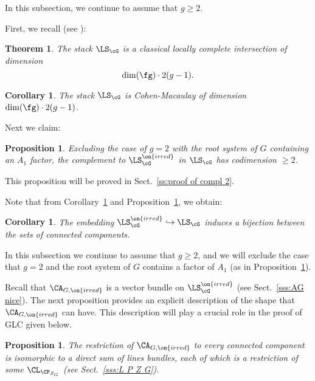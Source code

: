 \documentclass[9pt]{amsart}
\newtheorem{cor}[subsubsection]{Corollary}
\newtheorem{prop}[subsubsection]{Proposition}
\newtheorem{thm}[subsubsection]{Theorem}
\theoremstyle{remark}
\theoremstyle{definition}
\theoremstyle{remark}
\newcommand{\secref}[1]{Sect.~\ref{#1}}
\newcommand{\propref}[1]{Proposition~\ref{#1}}
\newcommand{\corref}[1]{Corollary~\ref{#1}}
\numberwithin{equation}{section}
\begin{document}
In this subsection, we continue to assume that $g\geq 2$. 

\sssec{}

First, we recall (see \cite[Proposition 2.11.2]{BD}):

\begin{thm} \label{t:LS CM}
The stack $\LS_\cG$ is a classical locally complete intersection of dimension 
$$\dim(\fg)\cdot 2(g-1).$$
\end{thm} 

\begin{cor}  \label{c:LS CM}
The stack $\LS_\cG$ is Cohen-Macaulay of dimension $\dim(\fg)\cdot 2(g-1)$.
\end{cor} 

\sssec{}

Next we claim:

\begin{prop} \label{p:compl 2}
Excluding the case of $g=2$ with the root system of $G$ containing an $A_1$ factor, 
the complement to $\LS_\cG^{\on{irred}}$ in $\LS_\cG$ has codimension $\geq 2$.
\end{prop}

This proposition will be proved in \secref{ss:proof of compl 2}.

\sssec{}

Note that from \corref{c:LS CM} and \propref{p:compl 2}, we obtain:

\begin{cor} \label{c:compl 2} 
The embedding $\LS^{\on{irred}}_\cG\hookrightarrow \LS_\cG$
induces a bijection between the sets of connected components.
\end{cor} 

 \label{ss:A G irred}

In this subsection we continue to assume that $g\geq 2$, and we will exclude the case that $g=2$ and the root system of 
$G$ contains a factor of $A_1$ (as in \propref{p:compl 2}). 

\sssec{}

Recall that $\CA_{G,\on{irred}}$ is a vector bundle on $\LS_\cG^{\on{irred}}$ (see \secref{sss:AG nice}). 
The next proposition provides an explicit description of the shape that $\CA_{G,\on{irred}}$ can have. This
description will play a crucial role in the proof of GLC given below. 

\begin{prop} \label{p:A irred}
The restriction of $\CA_{G,\on{irred}}$ to every connected component is isomorphic to a
direct sum of lines bundles, each of which is a restriction of some $\CL_{\CP_{Z_G}}$ 
(see \secref{sss:L P Z G}). 
\end{prop} 
\end{document}
